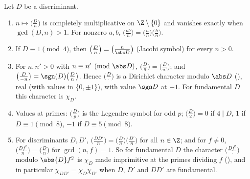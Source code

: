 \begin{proposition}\label{prop:rings:kronecker}
Let $D$ be a discriminant.
\begin{enumerate}[label=(\roman*)]
\item $n\mapsto\bigl(\frac Dn\bigr)$ is completely multiplicative on $\Z\setminus\{0\}$ and vanishes exactly when $\gcd(D,n)>1$. For nonzero $a,b$, $\bigl(\frac{ab}n\bigr)=\bigl(\frac an\bigr)\bigl(\frac bn\bigr)$.
\item If $D\equiv1\pmod4$, then $\bigl(\frac Dn\bigr)=\bigl(\frac n{\abs D}\bigr)$ (Jacobi symbol) for every $n>0$.
\item For $n,n'>0$ with $n\equiv n'\pmod{\abs D}$, $\bigl(\frac Dn\bigr)=\bigl(\frac D{n'}\bigr)$; and $\bigl(\frac D{-n}\bigr)=\sgn(D)\bigl(\frac Dn\bigr)$. Hence $\bigl(\frac D\cdot\bigr)$ is a
Dirichlet character modulo $\abs D$ (), real (with values in $\{0,\pm1\}$), with value $\sgn D$ at $-1$. For fundamental $D$
this character is $\chi_D$.
\item Values at primes: $\bigl(\frac Dp\bigr)$ is the Legendre symbol for odd $p$; $\bigl(\frac D2\bigr)=0$ if $4\mid D$, $1$ if $D\equiv1\pmod8$, $-1$ if $D\equiv5\pmod8$.
\item For discriminants $D,D'$, $\bigl(\frac{DD'}n\bigr)=\bigl(\frac Dn\bigr)\bigl(\frac{D'}n\bigr)$ for all $n\in\Z$; and for $f\ne0$, $\bigl(\frac{Df^2}n\bigr)=\bigl(\frac Dn\bigr)$ for $\gcd(n,f)=1$.
So for fundamental $D$ the character $\bigl(\frac{Df^2}\cdot\bigr)$ modulo $\abs{D}f^2$ is $\chi_D$ made imprimitive at the primes dividing $f$
(), and in particular $\chi_{DD'}=\chi_D\chi_{D'}$ when $D$, $D'$ and $DD'$ are fundamental.
\end{enumerate}
\end{proposition}

